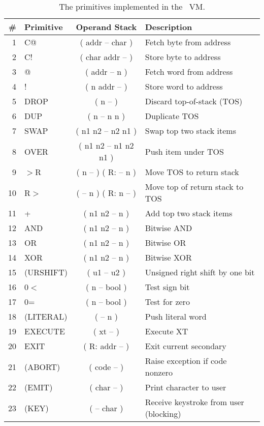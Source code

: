 \documentclass{article}
\begin{document}
\begin{table}
\begin{center}
\begin{tabular}{|r|l|c|l|} \hline
\textbf{\#} & \textbf{Primitive} & \textbf{Operand Stack} & 
    \textbf{Description} \\ \hline
 1 & C@        & ( addr -- char )      & Fetch byte from address \\ \hline
 2 & C!        & ( char addr -- )      & Store byte to address \\ \hline
 3 & @         & ( addr -- n )         & Fetch word from address \\ \hline
 4 & !         & ( n addr -- )         & Store word to address \\ \hline
 5 & DROP      & ( n -- )              & Discard top-of-stack (TOS) \\ \hline
 6 & DUP       & ( n -- n n )          & Duplicate TOS \\ \hline
 7 & SWAP      & ( n1 n2 -- n2 n1 )    & Swap top two stack items \\ \hline
 8 & OVER      & ( n1 n2 -- n1 n2 n1 ) & Push item under TOS \\ \hline
 9 & $>$R      & ( n -- ) ( R: -- n )  & Move TOS to return stack \\ \hline
10 & R$>$      & ( -- n ) ( R: n -- )  & Move top of return stack to
                                         TOS \\ \hline
11 & +         & ( n1 n2 -- n )        & Add top two stack items \\ \hline
12 & AND       & ( n1 n2 -- n )        & Bitwise AND \\ \hline
13 & OR        & ( n1 n2 -- n )        & Bitwise OR \\ \hline
14 & XOR       & ( n1 n2 -- n )        & Bitwise XOR \\ \hline
15 & (URSHIFT) & ( u1 -- u2 )          & Unsigned right shift by one
                                         bit \\ \hline
16 & 0$<$      & ( n -- bool )         & Test sign bit \\ \hline
17 & 0=        & ( n -- bool )         & Test for zero \\ \hline
18 & (LITERAL) & ( -- n )              & Push literal word \\ \hline
19 & EXECUTE   & ( xt -- )             & Execute XT \\ \hline
20 & EXIT      & ( R: addr -- )        & Exit current secondary \\ \hline
21 & (ABORT)   & ( code -- )           & Raise exception if code
                                         nonzero \\ \hline
22 & (EMIT)    & ( char -- )           & Print character to user \\ \hline
23 & (KEY)     & ( -- char )           & Receive keystroke from user
                                         (blocking) \\ \hline
\end{tabular}
\end{center}
\caption{The primitives implemented in the \M\ VM.}
\label{t:prim}
\end{table}
\end{document}
